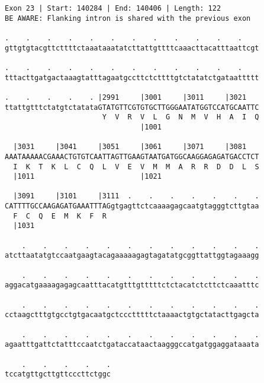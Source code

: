 \documentclass{article}
\begin{document}
\begin{Verbatim}
Exon 23 | Start: 140284 | End: 140406 | Length: 122
BE AWARE: Flanking intron is shared with the previous exon
 
.    .    .    .    .    .    .    .    .    .    .    .    
gttgtgtacgttcttttctaaataaatatcttattgttttcaaacttacatttaattcgt
  
.    .    .    .    .    .    .    .    .    .    .    .    
tttacttgatgactaaagtatttagaatgccttctcttttgtctatatctgataattttt
  
.    .    .    .    . |2991     |3001     |3011     |3021   
ttattgtttctatgtctatataGTATGTTCGTGTGCTTGGGAATATGGTCCATGCAATTC
                       Y  V  R  V  L  G  N  M  V  H  A  I  Q
                                |1001                       
  
  |3031     |3041     |3051     |3061     |3071     |3081   
AAATAAAAACGAAACTGTGTCAATTAGTTGAAGTAATGATGGCAAGGAGAGATGACCTCT
  I  K  T  K  L  C  Q  L  V  E  V  M  M  A  R  R  D  D  L  S
  |1011                         |1021                       
  
  |3091     |3101     |3111  .    .    .    .    .    .    .
CATTTTGCCAAGAGATGAAATTTAGgtgagttctcaaaagagcaatgtagggtcttgtaa
  F  C  Q  E  M  K  F  R                                    
  |1031                                                     
  
    .    .    .    .    .    .    .    .    .    .    .    .
atcttaatatgtccaatgaagtacagaaaaagagtagatatgcggttattggtagaaagg
  
    .    .    .    .    .    .    .    .    .    .    .    .
aggacatgaaaagagagcaatttacatgtttgtttttctctacatctcttctcaaatttc
  
    .    .    .    .    .    .    .    .    .    .    .    .
cctaagctttgtgcctgtgacaatgctccctttttctaaaactgtgctatacttgagcta
  
    .    .    .    .    .    .    .    .    .    .    .    .
agaatttgattctatttccaatctgataccataactaagggccatgatggaggataaata
  
    .    .    .    .    .
tccatgttgcttgttcccttctggc
\end{Verbatim}
\newpage
\end{document}

